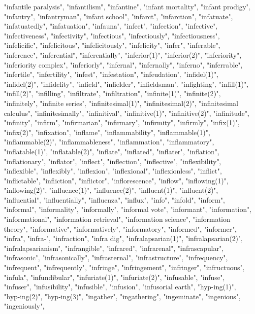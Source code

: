 "infantile paralysis",
"infantilism",
"infantine",
"infant mortality",
"infant prodigy",
"infantry",
"infantryman",
"infant school",
"infarct",
"infarction",
"infatuate",
"infatuatedly",
"infatuation",
"infauna",
"infect",
"infection",
"infective",
"infectiveness",
"infectivity",
"infectious",
"infectiously",
"infectiousness",
"infelicific",
"infelicitous",
"infelicitously",
"infelicity",
"infer",
"inferable",
"inference",
"inferential",
"inferentially",
"inferior(1)",
"inferior(2)",
"inferiority",
"inferiority complex",
"inferiorly",
"infernal",
"infernally",
"inferno",
"inferrable",
"infertile",
"infertility",
"infest",
"infestation",
"infeudation",
"infidel(1)",
"infidel(2)",
"infidelity",
"infield",
"infielder",
"infieldsman",
"infighting",
"infill(1)",
"infill(2)",
"infilling",
"infiltrate",
"infiltration",
"infinite(1)",
"infinite(2)",
"infinitely",
"infinite series",
"infinitesimal(1)",
"infinitesimal(2)",
"infinitesimal calculus",
"infinitesimally",
"infinitival",
"infinitive(1)",
"infinitive(2)",
"infinitude",
"infinity",
"infirm",
"infirmarian",
"infirmary",
"infirmity",
"infirmly",
"infix(1)",
"infix(2)",
"infixation",
"inflame",
"inflammability",
"inflammable(1)",
"inflammable(2)",
"inflammableness",
"inflammation",
"inflammatory",
"inflatable(1)",
"inflatable(2)",
"inflate",
"inflated",
"inflater",
"inflation",
"inflationary",
"inflator",
"inflect",
"inflection",
"inflective",
"inflexibility",
"inflexible",
"inflexibly",
"inflexion",
"inflexional",
"inflexionless",
"inflict",
"inflictable",
"infliction",
"inflictor",
"inflorescence",
"inflow",
"inflowing(1)",
"inflowing(2)",
"influence(1)",
"influence(2)",
"influent(1)",
"influent(2)",
"influential",
"influentially",
"influenza",
"influx",
"info",
"infold",
"inform",
"informal",
"informality",
"informally",
"informal vote",
"informant",
"information",
"informational",
"information retrieval",
"information science",
"information theory",
"informative",
"informatively",
"informatory",
"informed",
"informer",
"infra",
"infra-",
"infraction",
"infra dig",
"infralapsarian(1)",
"infralapsarian(2)",
"infralapsarianism",
"infrangible",
"infrared",
"infrarenal",
"infrascapular",
"infrasonic",
"infrasonically",
"infrasternal",
"infrastructure",
"infrequency",
"infrequent",
"infrequently",
"infringe",
"infringement",
"infringer",
"infructuous",
"infula",
"infundibular",
"infuriate(1)",
"infuriate(2)",
"infusable",
"infuse",
"infuser",
"infusibility",
"infusible",
"infusion",
"infusorial earth",
"hyp-ing(1)",
"hyp-ing(2)",
"hyp-ing(3)",
"ingather",
"ingathering",
"ingeminate",
"ingenious",
"ingeniously",
